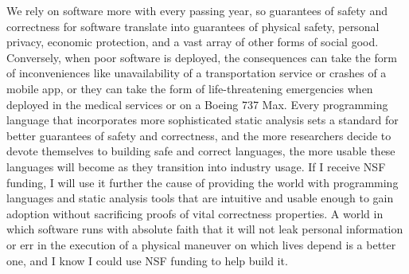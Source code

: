 \documentclass{nsf-grfp}
\begin{document}
We rely on software more with every passing year, so guarantees of safety and correctness for software translate into guarantees of physical safety, personal privacy, economic protection, and a vast array of other forms of social good. Conversely, when poor software is deployed, the consequences can take the form of inconveniences like unavailability of a transportation service or crashes of a mobile app, or they can take the form of life-threatening emergencies when deployed in the medical services or on a Boeing 737 Max. Every programming language that incorporates more sophisticated static analysis sets a standard for better guarantees of safety and correctness, and the more researchers decide to devote themselves to building safe and correct languages, the more usable these languages will become as they transition into industry usage. If I receive NSF funding, I will use it further the cause of providing the world with programming languages and static analysis tools that are intuitive and usable enough to gain adoption without sacrificing proofs of vital correctness properties. A world in which software runs with absolute faith that it will not leak personal information or err in the execution of a physical maneuver on which lives depend is a better one, and I know I could use NSF funding to help build it. 
\end{document}
